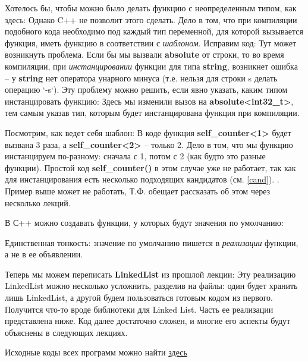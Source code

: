 \begin{lecture}[\lectureSubject]
	\begin{lecSection}[Шаблоны]
		Хотелось бы, чтобы можно было делать функцию с неопределенным типом, как здесь: \newpage
		Однако C++ не позволит этого сделать. Дело в том, что при компиляции подобного кода необходимо под каждый тип переменной, для которой вызывается функция, иметь функцию в соответствии с \textit{шаблоном}. Исправим код:
		Тут может возникнуть проблема. Если бы мы вызвали \textbf{absolute} от строки, то во время компиляции, при \textit{инстанцировании} функции для типа \textbf{string}, возникнет ошибка -- у \textbf{string} нет оператора унарного минуса (т.е. нельзя для строки s делать операцию `-s`). Эту проблему можно решить, если явно указать, каким типом инстанцировать функцию:
		Здесь мы изменили вызов на \textbf{absolute<int32\_t>}, тем самым указав тип, которым будет инстанцирована функция при компиляции.
		
		Посмотрим, как ведет себя шаблон:
		В коде функция \textbf{self\_counter<1>} будет вызвана 3 раза, а \textbf{self\_counter<2>} -- только 2. Дело в том, что мы функцию инстанцируем по-разному: сначала с 1, потом с 2 (как будто это разные функции). Простой код \textbf{self\_counter()} в этом случае уже не работает, так как для инстанцирования есть несколько подходящих кандидатов (см. \ref{cand}).
		.
		Пример выше может не работать, Т.Ф. обещает рассказать об этом через несколько лекций.
	\end{lecSection}
	\begin{lecSection}
		В С++ можно создавать функции, у которых будут значения по умолчанию:
		
		Единственная тонкость: значение по умолчанию пишется в \textit{реализации} функции, а не в ее объявлении.
	\end{lecSection}
	\begin{lecSection}
		Теперь мы можем переписать \textbf{LinkedList} из прошлой лекции:
		Эту реализацию LinkedList можно несколько усложнить, разделив на файлы: один будет хранить лишь LinkedList, а другой будем пользоваться готовым кодом из первого. Получится что-то вроде библиотеки для Linked List. Часть ее реализации представлена ниже. Код далее достаточно сложен, и многие его аспекты будут объяснены в следующих лекциях.
		\begin{center}
			\tiny{Исходные коды всех программ можно найти \href{https://github.com/alekseik1/latex\_works/tree/master/informatics/lecture\_6}{здесь}}
		\end{center}
	\end{lecSection}
\end{lecture}

